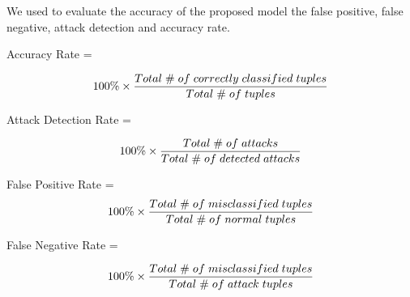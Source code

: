 \documentclass[twocolumn]{bmcart}%
\begin{document}
We used to evaluate the accuracy of the proposed model the false positive, false negative, attack detection and accuracy rate.


Accuracy Rate =

\begin{equation}\small
100\% \times \frac{ Total\hspace{0.1cm}\#\hspace{0.1cm}of\hspace{0.1cm}correctly\hspace{0.1cm}classified\hspace{0.1cm}tuples}{Total\hspace{0.1cm}\#\hspace{0.1cm}of\hspace{0.1cm} tuples}
\end{equation}

Attack Detection Rate =

\begin{equation}\small
100\% \times \frac{ Total\hspace{0.1cm}\#\hspace{0.1cm}of\hspace{0.1cm}attacks}{Total\hspace{0.1cm}\#\hspace{0.1cm}of\hspace{0.1cm}detected\hspace{0.1cm}attacks}
\end{equation}

False Positive Rate =
\begin{equation}\small
 100\% \times \frac{ Total\hspace{0.1cm}\#\hspace{0.1cm}of\hspace{0.1cm}misclassified\hspace{0.1cm}tuples}{Total\hspace{0.1cm}\#\hspace{0.1cm}of\hspace{0.1cm}normal\hspace{0.1cm} tuples}
\end{equation}

False Negative Rate =

\begin{equation}\small
100\% \times \frac{ Total\hspace{0.1cm}\#\hspace{0.1cm}of\hspace{0.1cm}misclassified\hspace{0.1cm}tuples}{Total\hspace{0.1cm}\#\hspace{0.1cm}of\hspace{0.1cm}attack\hspace{0.1cm}tuples}
\end{equation}
\end{document}
